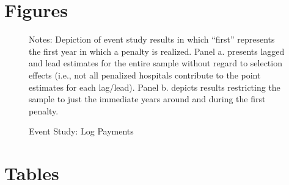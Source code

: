 \documentclass[12pt]{article}
\begin{document}
\newpage




\clearpage
\newpage
\appendix
\section*{Figures}
\label{app:figures}
\newsavebox{\gfxbox}
\setlength{\captionmargin}{.5 \textwidth} \addtolength{\captionmargin}{-.5\wd\gfxbox}
\begin{figure}[ht!]
\centering
\caption{Event Study: Log Payments}
\label{fig:event}
\usebox{\gfxbox}
\par
\begin{minipage}{\wd\gfxbox}
\footnotesize 
Notes:  Depiction of event study results in which ``first'' represents the first year in which a penalty is realized. Panel a. presents lagged and lead estimates for the entire sample without regard to selection effects (i.e., not all penalized hospitals contribute to the point estimates for each lag/lead).  Panel b. depicts results restricting the sample to just the immediate years around and during the first penalty.  
\end{minipage}
\end{figure}





\section*{Tables}
\label{app:tables}
\end{document}
